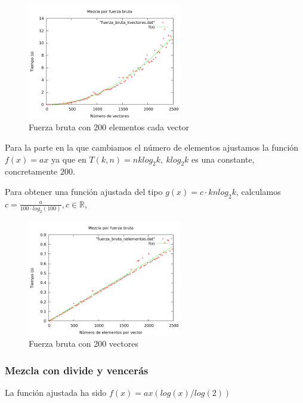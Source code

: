 \begin{figure}[htb] 
\centering
	\includegraphics[width=0.6\textwidth]{../Obligatorio/Graficas/fuerza_bruta_kvectores.png}
	\caption{Fuerza bruta con 200 elementos cada vector} 
	\label{fig:f_kvectores} 
\end{figure}

\newpage
Para la parte en la que cambiamos el n\'umero de elementos ajustamos la funci\'on 
$f(x) = ax$ ya 	que en $T(k, n) = nklog_2k, \ klog_2k$ es una constante, concretamente $200$.

\begin{center}
\end{center}

Para obtener una funci\'on ajustada del tipo $g(x)=c\cdot knlog_2k$, calculamos $c=\frac{a}{100\cdot log_2(100)}, c \in \mathbb{R}$,

\begin{figure}[htb] 
\centering
	\includegraphics[width=0.6\textwidth]{../Obligatorio/Graficas/fuerza_bruta_nelementos.png}
	\caption{Fuerza bruta con 200 vectores} 
	\label{fig:f_nelementos} 
\end{figure}
\newpage


\subsubsection{Mezcla con divide y vencer\'as}
La funci\'on ajustada ha sido $f(x) = ax(log(x)/log(2))$

